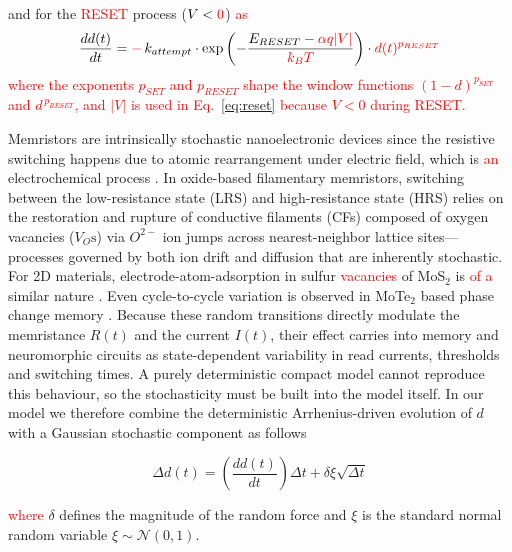 \documentclass[aip,apl,reprint,floatfix]{revtex4-2}
\newcommand{\changed}[1]{\textcolor{red}{#1}}
\begin{document}
and for the \changed{RESET} process ($V < \changed{0}$) \changed{as}
\begin{equation}
    \frac{dd(t)}{dt} = \changed{-\,}k_{attempt} \cdot \exp\left( -\frac{E_{RESET} - \changed{\alpha q|V|}}{\changed{k_B T}} \right) \cdot \changed{d(t)^{p_{RESET}}}
    \label{eq:reset}
\end{equation}
\changed{\noindent where the exponents $p_{SET}$ and $p_{RESET}$ shape the window functions $(1-d)^{p_{SET}}$ and $d^{\,p_{RESET}}$, and $|V|$ is used in Eq.~\eqref{eq:reset} because $V<0$ during RESET.}

Memristors are intrinsically stochastic nanoelectronic devices since the resistive switching happens due to atomic rearrangement under electric field, which is \changed{an} electrochemical process \cite{Filatov,Lee}. In oxide-based filamentary memristors, switching between the low-resistance state (LRS) and high-resistance state (HRS) relies on the restoration and rupture of conductive filaments (CFs) composed of oxygen vacancies ($V_O\text{s}$) via $O^{2-}$ ion jumps across nearest-neighbor lattice sites—processes governed by both ion drift and diffusion that are inherently stochastic. For 2D materials, electrode-atom-adsorption in sulfur \changed{vacancies} of MoS$_2$ is \changed{of a} similar nature \cite{Tsai2017}. Even cycle-to-cycle variation is observed in MoTe$_2$ based phase change memory \cite{Hong}.  Because these random transitions directly modulate the memristance $R(t)$ and the current $I(t)$, their effect carries into memory and neuromorphic circuits as state-dependent variability in read currents, thresholds and switching times. A purely deterministic compact model cannot reproduce this behaviour, so the stochasticity must be built into the model itself. In our model we therefore combine the deterministic Arrhenius-driven evolution of $d$ with a Gaussian stochastic component as follows

\begin{equation}
\Delta d(t) = \left( \frac{dd(t)}{dt} \right) \Delta t + \delta \xi \sqrt{\Delta t}
\end{equation}

\noindent \changed{where} $\delta$ defines the magnitude of the random force and $\xi$ is the standard normal random variable $\xi \sim \mathcal{N}(0,1)$.
\end{document}
